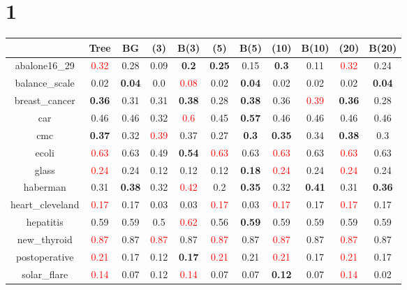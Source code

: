 \documentclass{article}%
\begin{document}
\section*{1}%
\begin{tabular}{c|cccccccccc}%
\hline%
&Tree&BG&(3)&B(3)&(5)&B(5)&(10)&B(10)&(20)&B(20)\\%
\hline%
abalone16\_29&\textcolor{red}{ 
0.32
}&0.28&0.09&\textbf{0.2}&\textbf{0.25}&0.15&\textbf{0.3}&0.11&\textcolor{red}{ 
0.32
}&0.24\\%
\hline%
balance\_scale&0.02&\textbf{0.04}&0.0&\textcolor{red}{ 
0.08
}&0.02&\textbf{0.04}&0.02&0.02&0.02&\textbf{0.04}\\%
\hline%
breast\_cancer&\textbf{0.36}&0.31&0.31&\textbf{0.38}&0.28&\textbf{0.38}&0.36&\textcolor{red}{ 
0.39
}&\textbf{0.36}&0.28\\%
\hline%
car&0.46&0.46&0.32&\textcolor{red}{ 
0.6
}&0.45&\textbf{0.57}&0.46&0.46&0.46&0.46\\%
\hline%
cmc&\textbf{0.37}&0.32&\textcolor{red}{ 
0.39
}&0.37&0.27&\textbf{0.3}&\textbf{0.35}&0.34&\textbf{0.38}&0.3\\%
\hline%
ecoli&\textcolor{red}{ 
0.63
}&0.63&0.49&\textbf{0.54}&\textcolor{red}{ 
0.63
}&0.63&\textcolor{red}{ 
0.63
}&0.63&\textcolor{red}{ 
0.63
}&0.63\\%
\hline%
glass&\textcolor{red}{ 
0.24
}&0.24&0.12&0.12&0.12&\textbf{0.18}&\textcolor{red}{ 
0.24
}&0.24&\textcolor{red}{ 
0.24
}&0.24\\%
\hline%
haberman&0.31&\textbf{0.38}&0.32&\textcolor{red}{ 
0.42
}&0.2&\textbf{0.35}&0.32&\textbf{0.41}&0.31&\textbf{0.36}\\%
\hline%
heart\_cleveland&\textcolor{red}{ 
0.17
}&0.17&0.03&0.03&\textcolor{red}{ 
0.17
}&0.03&\textcolor{red}{ 
0.17
}&0.17&\textcolor{red}{ 
0.17
}&0.17\\%
\hline%
hepatitis&0.59&0.59&0.5&\textcolor{red}{ 
0.62
}&0.56&\textbf{0.59}&0.59&0.59&0.59&0.59\\%
\hline%
new\_thyroid&\textcolor{red}{ 
0.87
}&0.87&\textcolor{red}{ 
0.87
}&0.87&\textcolor{red}{ 
0.87
}&0.87&\textcolor{red}{ 
0.87
}&0.87&\textcolor{red}{ 
0.87
}&0.87\\%
\hline%
postoperative&\textcolor{red}{ 
0.21
}&0.17&0.12&\textbf{0.17}&\textcolor{red}{ 
0.21
}&0.21&\textcolor{red}{ 
0.21
}&0.17&\textcolor{red}{ 
0.21
}&0.17\\%
\hline%
solar\_flare&\textcolor{red}{ 
0.14
}&0.07&0.12&\textcolor{red}{ 
0.14
}&0.07&0.07&\textbf{0.12}&0.07&\textcolor{red}{ 
0.14
}&0.02\\%

\end{tabular}
\end{document}
